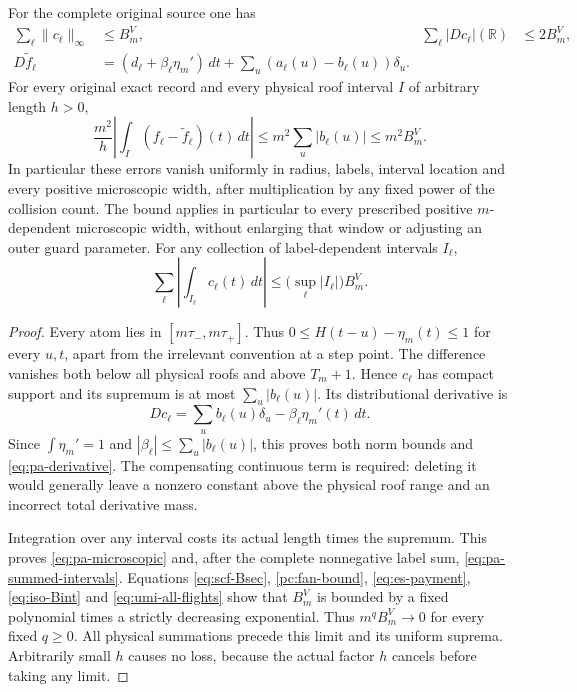 \begin{proposition}
\label{prop:pa-primitive}
For the complete original source one has
\begin{align}
 \sum_\ell\|c_\ell\|_\infty&\le B_m^V,&
 \sum_\ell |Dc_\ell|(\mathbb R)&\le2B_m^V,
                                                    \label{eq:pa-norms}\\
 D\widetilde f_\ell
  &=(d_\ell+\beta_\ell\eta_m')\,dt
             +\sum_u(a_\ell(u)-b_\ell(u))\delta_u.
                                                    \label{eq:pa-derivative}
\end{align}
For every original exact record and every physical roof interval
$I$ of arbitrary length $h>0$,
\begin{equation}\label{eq:pa-microscopic}
 \frac{m^2}{h}\left|\int_I(f_\ell-\widetilde f_\ell)(t)\,dt\right|
       \le m^2\sum_u|b_\ell(u)|\le m^2B_m^V.
\end{equation}
In particular these errors vanish uniformly in radius, labels,
interval location and every positive microscopic width, after
multiplication by any fixed power of the collision count.
The bound applies in particular to every prescribed positive
$m$-dependent microscopic width, without enlarging that window
or adjusting an outer guard parameter.
For any collection of label-dependent intervals $I_\ell$,
\begin{equation}\label{eq:pa-summed-intervals}
 \sum_\ell\left|\int_{I_\ell}c_\ell(t)\,dt\right|
       \le \bigl(\sup_\ell |I_\ell|\bigr)B_m^V.
\end{equation}
\end{proposition}
\begin{proof}
Every atom lies in $[m\tau_-,m\tau_+]$. Thus
$0\le H(t-u)-\eta_m(t)\le1$ for every $u,t$, apart from
the irrelevant convention at a step point. The difference
vanishes both below all physical roofs and above $T_m+1$.
Hence $c_\ell$ has compact support and its supremum is at
most $\sum_u|b_\ell(u)|$. Its distributional derivative is
\[
 Dc_\ell=\sum_u b_\ell(u)\delta_u-\beta_\ell\eta_m'(t)\,dt.
\]
Since $\int\eta_m'=1$ and $|\beta_\ell|\le\sum_u|b_\ell(u)|$,
this proves both norm bounds and \eqref{eq:pa-derivative}.
The compensating continuous term is required: deleting it
would generally leave a nonzero constant above the physical
roof range and an incorrect total derivative mass.

Integration over any interval costs its actual length times
the supremum. This proves \eqref{eq:pa-microscopic} and,
after the complete nonnegative label sum,
\eqref{eq:pa-summed-intervals}. Equations \eqref{eq:scf-Bsec}, \eqref{pc:fan-bound},
\eqref{eq:es-payment}, \eqref{eq:iso-Bint} and
\eqref{eq:umi-all-flights} show that $B_m^V$ is bounded by a
fixed polynomial times a strictly decreasing exponential.
Thus $m^q B_m^V\to0$ for every fixed $q\ge0$.
All physical summations precede this limit and its uniform
suprema. Arbitrarily small $h$ causes no loss, because the
actual factor $h$ cancels before taking any limit.
\end{proof}

